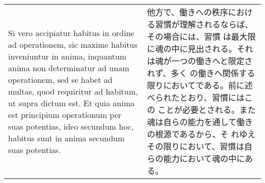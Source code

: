 \documentclass[10pt]{jsarticle} %
\begin{document}
\begin{longtable}{p{21em}p{21em}}
Si vero accipiatur habitus in
ordine ad operationem, sic maxime habitus inveniuntur in anima,
inquantum anima non determinatur ad unam operationem, sed se habet ad
multas, quod requiritur ad habitum, ut supra dictum est. Et quia anima
est principium operationum per suas potentias, ideo secundum hoc,
habitus sunt in anima secundum suas potentias.

&

他方で、働きへの秩序における習慣が理解されるならば、その場合には、習慣
は最大限に魂の中に見出される。それは魂が一つの働きへと限定されず、多く
の働きへ関係する限りにおいてである。前に述べられたとおり、習慣にはこの
ことが必要とされる。また魂は自らの能力を通して働きの根源であるから、そ
れゆえその限りにおいて、習慣は自らの能力において魂の中にある。

\\

\end{longtable}

\schema
{
}
{
    \schema
    {
    }
    {
    }
}
\end{document}
